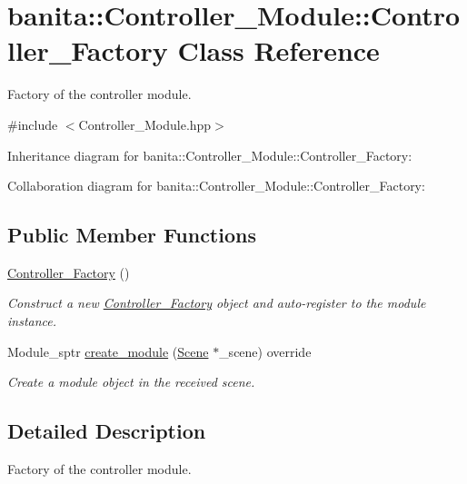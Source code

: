 \hypertarget{classbanita_1_1_controller___module_1_1_controller___factory}{}\section{banita\+::Controller\+\_\+\+Module\+::Controller\+\_\+\+Factory Class Reference}
\label{classbanita_1_1_controller___module_1_1_controller___factory}


Factory of the controller module.  




{\ttfamily \#include $<$Controller\+\_\+\+Module.\+hpp$>$}



Inheritance diagram for banita\+::Controller\+\_\+\+Module\+::Controller\+\_\+\+Factory\+:


Collaboration diagram for banita\+::Controller\+\_\+\+Module\+::Controller\+\_\+\+Factory\+:
\subsection*{Public Member Functions}
\begin{DoxyCompactItemize}
\item 
\mbox{\hyperlink{classbanita_1_1_controller___module_1_1_controller___factory_adb1e5b58ae1d7196a2eafda08829c2dd}{Controller\+\_\+\+Factory}} ()
\begin{DoxyCompactList}\small\item\em Construct a new \mbox{\hyperlink{classbanita_1_1_controller___module_1_1_controller___factory}{Controller\+\_\+\+Factory}} object and auto-\/register to the module instance. \end{DoxyCompactList}\item 
Module\+\_\+sptr \mbox{\hyperlink{classbanita_1_1_controller___module_1_1_controller___factory_ab2c4918b3556a079397bd06246b13a20}{create\+\_\+module}} (\mbox{\hyperlink{classbanita_1_1_scene}{Scene}} $\ast$\+\_\+scene) override
\begin{DoxyCompactList}\small\item\em Create a module object in the received scene. \end{DoxyCompactList}\end{DoxyCompactItemize}


\subsection{Detailed Description}
Factory of the controller module. 



